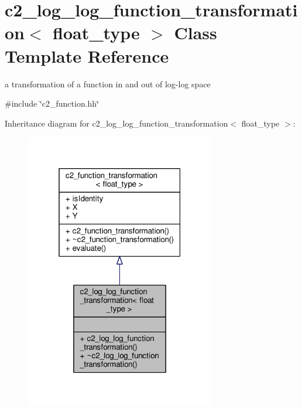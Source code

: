 \hypertarget{classc2__log__log__function__transformation}{}\section{c2\+\_\+log\+\_\+log\+\_\+function\+\_\+transformation$<$ float\+\_\+type $>$ Class Template Reference}
\label{classc2__log__log__function__transformation}


a transformation of a function in and out of log-\/log space  




{\ttfamily \#include \char`\"{}c2\+\_\+function.\+hh\char`\"{}}



Inheritance diagram for c2\+\_\+log\+\_\+log\+\_\+function\+\_\+transformation$<$ float\+\_\+type $>$\+:
\nopagebreak
\begin{figure}[H]
\begin{center}
\leavevmode
\includegraphics[width=235pt]{classc2__log__log__function__transformation__inherit__graph}
\end{center}
\end{figure}


